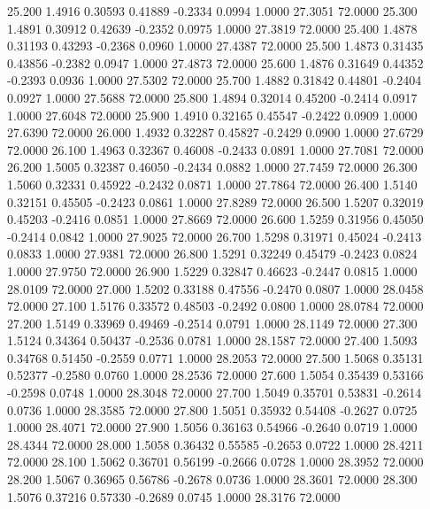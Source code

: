   25.200   1.4916   0.30593   0.41889  -0.2334   0.0994   1.0000  27.3051  72.0000
  25.300   1.4891   0.30912   0.42639  -0.2352   0.0975   1.0000  27.3819  72.0000
  25.400   1.4878   0.31193   0.43293  -0.2368   0.0960   1.0000  27.4387  72.0000
  25.500   1.4873   0.31435   0.43856  -0.2382   0.0947   1.0000  27.4873  72.0000
  25.600   1.4876   0.31649   0.44352  -0.2393   0.0936   1.0000  27.5302  72.0000
  25.700   1.4882   0.31842   0.44801  -0.2404   0.0927   1.0000  27.5688  72.0000
  25.800   1.4894   0.32014   0.45200  -0.2414   0.0917   1.0000  27.6048  72.0000
  25.900   1.4910   0.32165   0.45547  -0.2422   0.0909   1.0000  27.6390  72.0000
  26.000   1.4932   0.32287   0.45827  -0.2429   0.0900   1.0000  27.6729  72.0000
  26.100   1.4963   0.32367   0.46008  -0.2433   0.0891   1.0000  27.7081  72.0000
  26.200   1.5005   0.32387   0.46050  -0.2434   0.0882   1.0000  27.7459  72.0000
  26.300   1.5060   0.32331   0.45922  -0.2432   0.0871   1.0000  27.7864  72.0000
  26.400   1.5140   0.32151   0.45505  -0.2423   0.0861   1.0000  27.8289  72.0000
  26.500   1.5207   0.32019   0.45203  -0.2416   0.0851   1.0000  27.8669  72.0000
  26.600   1.5259   0.31956   0.45050  -0.2414   0.0842   1.0000  27.9025  72.0000
  26.700   1.5298   0.31971   0.45024  -0.2413   0.0833   1.0000  27.9381  72.0000
  26.800   1.5291   0.32249   0.45479  -0.2423   0.0824   1.0000  27.9750  72.0000
  26.900   1.5229   0.32847   0.46623  -0.2447   0.0815   1.0000  28.0109  72.0000
  27.000   1.5202   0.33188   0.47556  -0.2470   0.0807   1.0000  28.0458  72.0000
  27.100   1.5176   0.33572   0.48503  -0.2492   0.0800   1.0000  28.0784  72.0000
  27.200   1.5149   0.33969   0.49469  -0.2514   0.0791   1.0000  28.1149  72.0000
  27.300   1.5124   0.34364   0.50437  -0.2536   0.0781   1.0000  28.1587  72.0000
  27.400   1.5093   0.34768   0.51450  -0.2559   0.0771   1.0000  28.2053  72.0000
  27.500   1.5068   0.35131   0.52377  -0.2580   0.0760   1.0000  28.2536  72.0000
  27.600   1.5054   0.35439   0.53166  -0.2598   0.0748   1.0000  28.3048  72.0000
  27.700   1.5049   0.35701   0.53831  -0.2614   0.0736   1.0000  28.3585  72.0000
  27.800   1.5051   0.35932   0.54408  -0.2627   0.0725   1.0000  28.4071  72.0000
  27.900   1.5056   0.36163   0.54966  -0.2640   0.0719   1.0000  28.4344  72.0000
  28.000   1.5058   0.36432   0.55585  -0.2653   0.0722   1.0000  28.4211  72.0000
  28.100   1.5062   0.36701   0.56199  -0.2666   0.0728   1.0000  28.3952  72.0000
  28.200   1.5067   0.36965   0.56786  -0.2678   0.0736   1.0000  28.3601  72.0000
  28.300   1.5076   0.37216   0.57330  -0.2689   0.0745   1.0000  28.3176  72.0000

